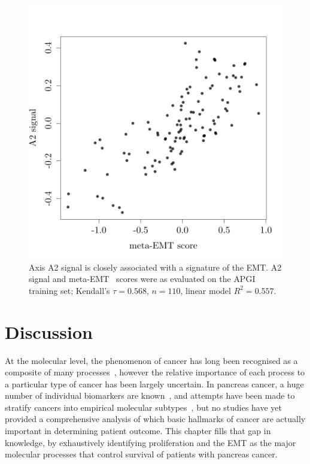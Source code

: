\documentclass[dissertation.tex]{subfiles}
\begin{document}
\begin{figure}[!htbp]
\centering
\includegraphics[width=.7\linewidth]{analysis/biosurv/reports/18_SIS_diag_dsd_final/figure/nmf-msigdb-cor-plots-8}
\caption[A2 signal is closely associated with meta-EMT score]{Axis A2 signal is closely associated with a signature of the \gls{EMT}.  A2 signal and meta-EMT~\cite{Groger2012} scores were as evaluated on the \acrshort{APGI} training set; Kendall's $\tau = 0.568$, $n = 110$, linear model $R^2 = 0.557$.}\label{fig:sigs-axis2-emt}
\end{figure}

\section{Discussion}
At the molecular level, the phenomenon of cancer has long been recognised as a composite of many processes~\cite{Hanahan2011}, however the relative importance of each process to a particular type of cancer has been largely uncertain.  In pancreas cancer, a huge number of individual biomarkers are known~\cite{Harsha2009}, and attempts have been made to stratify cancers into empirical molecular subtypes~\cite{Collisson2011}, but no studies have yet provided a comprehensive analysis of which basic hallmarks of cancer are actually important in determining patient outcome.  This chapter fills that gap in knowledge, by exhaustively identifying proliferation and the \gls{EMT} as the major molecular processes that control survival of patients with pancreas cancer.

\end{document}
